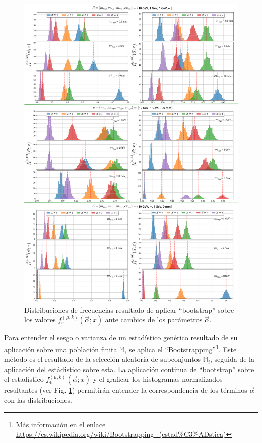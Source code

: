 \begin{figure}[!ht]
\centering
\includegraphics[width=.9\textwidth]{Simulacion/imagenes/Distribucion_Entries.png}
\caption{Distribuciones de frecuencias resultado de aplicar ``bootstrap'' sobre los valores $f^{(\mu, k)}_\textsf{e} (\vec{\alpha}; x)$ ante cambios de los parámetros $\vec{\alpha}$.}
\label{entradas}
\end{figure}

Para entender el sesgo o varianza de un estadístico genérico resultado de su aplicación sobre una población finita $\mathbb{M}$, se aplica el ``Bootstrapping''\footnote{Más información en el enlace \href{https://es.wikipedia.org/wiki/Bootstrapping\_(estad\%C3\%ADstica)}{https://\-es.\-wi\-ki\-pe\-dia.\-org/\-wi\-ki/\-Boots\-tra\-pping\_(es\-tad\-\%C3\-\%AD\-sti\-ca)}}. Este método es el resultado de la selección aleatoria de subconjuntos $\mathbb{M}_i$, seguida de la aplicación del estádistico sobre esta. La aplicación continua de ``bootstrap'' sobre el estadístico $f^{(\mu, k)}_\textsf{e} (\vec{\alpha}; x)$ y el graficar los histogramas normalizados resultantes (ver Fig. \ref{entradas}) permitirán entender la correspondencia de los términos $\vec{\alpha}$ con las distribuciones.

